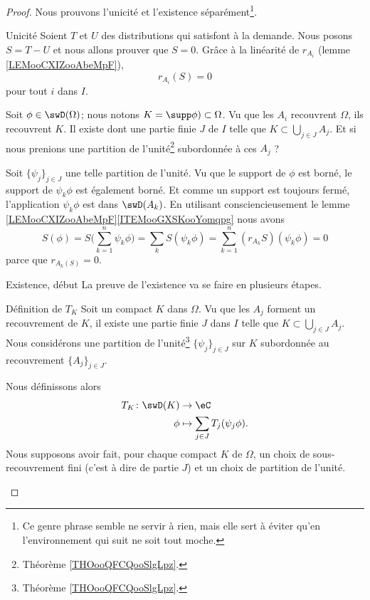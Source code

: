 \begin{proof}
    Nous prouvons l'unicité et l'existence séparément\footnote{Ce genre phrase semble ne servir à rien, mais elle sert à éviter qu'en l'environnement  qui suit ne soit tout moche.}.
    \begin{subproof}
    \item[Unicité]
        Soient \( T\) et \( U\) des distributions qui satisfont à la demande. Nous posons \( S=T-U\) et nous allons prouver que \( S=0\). Grâce à la linéarité de \( r_{A_i}\) (lemme \ref{LEMooCXIZooAbeMpF}),
        \begin{equation}
            r_{A_i}(S)=0
        \end{equation}
        pour tout \( i\) dans \( I\).

        Soit \( \phi\in \swD(\Omega)\); nous notons \( K=\supp\phi)\subset\Omega\). Vu que les \( A_i\) recouvrent \( \Omega\), ils recouvrent \( K\). Il existe dont une partie finie \( J\) de \( I\) telle que \( K\subset\bigcup_{j\in J}A_j\). Et si nous prenions une partition de l'unité\footnote{Théorème \ref{THOooQFCQooSlgLpz}.} subordonnée à ces \( A_j\) ?

        Soit \( \{ \psi_j \}_{j\in J}\) une telle partition de l'unité. Vu que le support de \( \phi\) est borné, le support de \( \psi_k\phi\) est également borné. Et comme un support est toujours fermé, l'application \( \psi_k\phi\) est dans \( \swD(A_k)\). En utilisant consciencieusement le lemme \ref{LEMooCXIZooAbeMpF}\ref{ITEMooGXSKooYomqpg} nous avons
        \begin{equation}
            S(\phi)=S\big( \sum_{k=1}^n\psi_k\phi \big)=\sum_kS(\psi_k\phi)=\sum_{k=1}^n(r_{A_k}S)(\psi_k\phi)=0
        \end{equation}
        parce que \( r_{A_k(S)}=0\).
    \item[Existence, début]
        La preuve de l'existence va se faire en plusieurs étapes.

    \item[Définition de $T_K$]
        Soit un compact \( K\) dans \( \Omega\). Vu que les \( A_j\) forment un recouvrement de \( K\), il existe une partie finie \( J\) dans \( I\) telle que \( K\subset\bigcup_{j\in J}A_j\). Nous considérons une partition de l'unité\footnote{Théorème \ref{THOooQFCQooSlgLpz}.} \( \{ \psi_j \}_{j\in J}\) sur \( K\) subordonnée au recouvrement \( \{ A_j \}_{j\in J}\).

        Nous définissons alors
        \begin{equation}
            \begin{aligned}
                T_K\colon \swD(K)&\to \eC \\
                \phi&\mapsto \sum_{j\in J}T_j(\psi_j\phi). 
            \end{aligned}
        \end{equation}
        Nous supposons avoir fait, pour chaque compact \( K\) de \( \Omega\), un choix de sous-recouvrement fini (c'est à dire de partie \( J\)) et un choix de partition de l'unité.


\end{subproof}
\end{proof}
